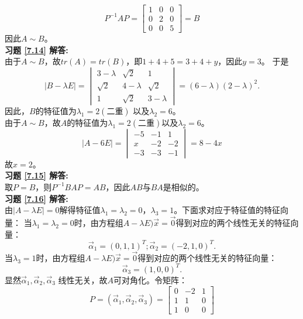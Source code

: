 \documentclass[a4paper]{book}
\begin{document}
\begin{equation*}
P^{-1}AP=\begin{bmatrix}
  1&0&0\\
  0&2&0\\
  0&0&5
\end{bmatrix}=B
\end{equation*}
因此$A\sim B$。\\
\textbf{习题 \ref{7.14} 解答:}\\
由于$A\sim B$，故$tr(A)=tr(B)$，即$1+4+5=3+4+y$，因此$y=3$。
于是
\begin{equation*}
|B-\lambda E|=\begin{vmatrix}3-\lambda&\sqrt{2}&1\\ \sqrt{2}&4-\lambda&\sqrt{2}\\1&\sqrt{2}&3-\lambda\end{vmatrix}
=(6-\lambda)(2-\lambda)^2.
\end{equation*}
因此，$B$的特征值为$\lambda_1=2(\text{二重})$ 以及$\lambda_2=6$。\\
由于$A\sim B$，故$A$的特征值为$\lambda_1=2(\text{二重})$以及$\lambda_2=6$。
\begin{equation*}
  |A-6E|=\begin{vmatrix}-5&-1&1\\x&-2&-2\\-3&-3&-1\end{vmatrix}=8-4x
\end{equation*}
故$x=2$。\\
\textbf{习题 \ref{7.15} 解答:}\\
取$P=B$，则$P^{-1}BAP=AB$，因此$AB$与$BA$是相似的。\\
\textbf{习题 \ref{7.16} 解答:}\\
由$|A-\lambda E|=0$解得特征值$\lambda_1=\lambda_2=0$，$\lambda_3=1$。下面求对应于特征值的特征向量：
当$\lambda_1=\lambda_2=0$时，由方程组$A-\lambda E)\vec{x}=\vec{0}$得到对应的两个线性无关的特征向量：
\begin{equation}
  \vec{\alpha}_1=(0,1,1)^T;\vec{\alpha}_2=(-2,1,0)^T.
\end{equation}
当$\lambda_3=1$时，由方程组$A-\lambda E)\vec{x}=\vec{0}$得到对应的两个线性无关的特征向量：
\begin{equation}
  \vec{\alpha}_3=(1,0,0)^T.
\end{equation}
显然$\vec{\alpha}_1,\vec{\alpha}_2,\vec{\alpha}_3$ 线性无关，故$A$可对角化。令矩阵：
\begin{equation*}
 P=(\vec{\alpha}_1,\vec{\alpha}_2,\vec{\alpha}_3)=\begin{bmatrix}0&-2&1\\1&1&0\\1&0&0\end{bmatrix}
\end{equation*}
\end{document}
